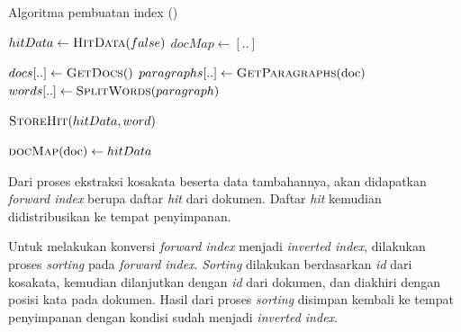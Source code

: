 \begin{algorithm}[H]
  \caption{Algoritma pembuatan index (\cite{brin1998google})}\label{alg:index}
  \begin{algorithmic}
    \State $hitData \gets \Call{HitData}{false}$ 
    \State $docMap \gets [..]$

    \item[] %

    \State $docs[..] \gets \Call{GetDocs}$
      \State $paragraphs[..] \gets \Call{GetParagraphs}{$doc$}$
        \State $words[..] \gets \Call{SplitWords}{$$paragraph$$}$

        \item[] %

          \State $\Call{StoreHit}{$$hitData, word$$}$
        \EndFor

        \item[] %

          \State $\Call{docMap}{$doc$} \gets hitData$
      \EndFor
    \EndFor
  \end{algorithmic}
\end{algorithm}

Dari proses ekstraksi kosakata beserta data tambahannya, akan didapatkan
\textit{forward index} berupa daftar \textit{hit} dari dokumen. Daftar
\textit{hit} kemudian didistribusikan ke tempat penyimpanan.

Untuk melakukan konversi \textit{forward index} menjadi \textit{inverted index},
dilakukan proses \textit{sorting} pada \textit{forward index}. \textit{Sorting}
dilakukan berdasarkan \textit{id} dari kosakata, kemudian dilanjutkan dengan
\textit{id} dari dokumen, dan diakhiri dengan posisi kata pada dokumen. Hasil
dari proses \textit{sorting} disimpan kembali ke tempat penyimpanan dengan
kondisi sudah menjadi \textit{inverted index}.

